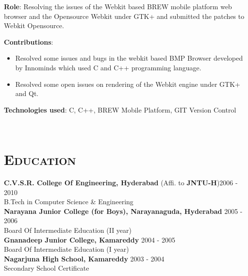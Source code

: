 \begin{resume}
\begin{position}
\textbf{Role}: Resolving the issues of the Webkit based BREW mobile
platform web browser and the Opensource Webkit under GTK+ and
submitted the patches to Webkit Opensource.

\textbf{Contributions}:
\begin{itemize}
\item Resolved some issues and bugs in the webkit based BMP Browser
  developed by Innominds which used C and C++ programming language.
\item Resolved some open issues on rendering of the Webkit engine
  under GTK+ and Qt.
\end{itemize}
\textbf{Technologies used}: C, C++, BREW Mobile Platform, GIT Version
Control
\end{position}
\\


\section{\textsc{Education}}

\textbf{C.V.S.R. College Of Engineering, Hyderabad} (Affi. to \textbf{JNTU-H})\hfill 2006 - 2010 \\
B.Tech in Computer Science \& Engineering\hfill \\
\newline
\textbf{Narayana Junior College (for Boys), Narayanaguda, Hyderabad} \hfill 2005 - 2006 \\ 
Board Of Intermediate Education (II year) \\
\textbf{Gnanadeep Junior College, Kamareddy} \hfill 2004 - 2005\\
Board Of Intermediate Education (I year) \\
\newline
\textbf{Nagarjuna High School, Kamareddy} \hfill 2003 - 2004 \\
Secondary School Certificate
\\




\end{resume}
